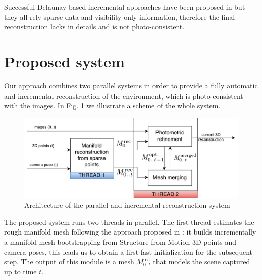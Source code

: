 Successful Delaunay-based incremental approaches have been proposed in \cite{lovi_et_al_11,hoppe2013incremental,litvinov_lhuillier_13,romanoni15b} but they all rely sparse data and visibility-only information, therefore the final reconstruction lacks in details and is not photo-consistent.



\section{Proposed system}
 Our approach combines two parallel systems in order to provide a fully automatic and incremental reconstruction of the environment, which is photo-consistent with the images. In Fig. \ref{fig:architecture} we illustrate a scheme of the whole system.
 
 \begin{figure}[t]
  \centering
  \includegraphics[width=\textwidth]{./img/ch-incr-dens/incremental-mvs-architecture}
  \caption{Architecture of the parallel and incremental reconstruction system}
  \label{fig:architecture}
\end{figure}


The proposed system runs two threads in parallel.
The first thread estimates the rough manifold mesh following the approach proposed in \cite{litvinov_lhuillier_13,romanoni15a}: it builds incrementally a manifold mesh bootstrapping from Structure from Motion 3D points and camera poses, this leads us to obtain a first fast initialization for the subsequent step. The output of this module is a mesh $\mathit{M}_{0..t}^{\text{rec}}$ that models the scene captured up to time $t$.

